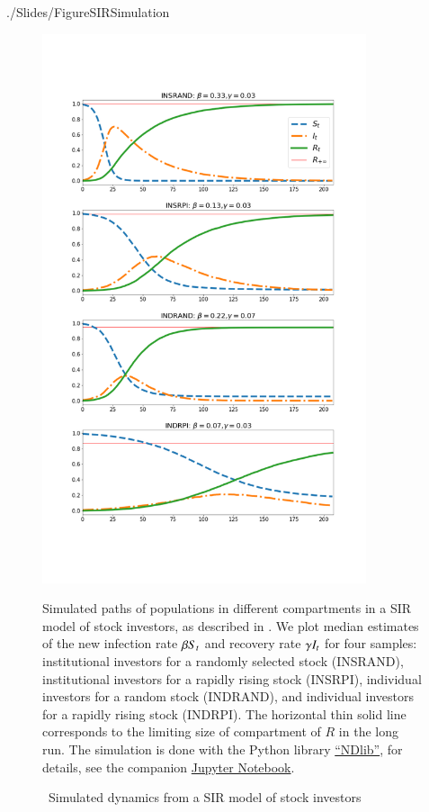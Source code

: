 \begin{verbatimwrite}{./Slides/FigureSIRSimulation}%
    \begin{figure} \centering  %
        \caption{ ~Simulated dynamics from a SIR model of stock investors}
        \label{fig:sir_simulate}
        \centerline{\includegraphics[width=0.85\textwidth,height=0.85\textheight]{./figures/sir_simulate}}
        \begin{flushleft}
            {\footnotesize Simulated paths of populations in different compartments in a SIR model of stock investors, as described in \cite{shiller1989survey}. We plot median estimates of the new infection rate $\beta \Susceptible_{t}$ and recovery rate $\gamma \Infected_{t}$ for four samples: institutional investors for a randomly selected stock (INSRAND), institutional investors for a rapidly rising stock (INSRPI), individual investors for a random stock (INDRAND), and individual investors for a rapidly rising stock (INDRPI). The horizontal thin solid line corresponds to the limiting size of compartment of $R$ in the long run. The simulation is done with the Python library \href{https://ndlib.readthedocs.io/en/latest/}{``NDlib''}, for details, see the companion \href{https://github.com/llorracc/EpiExp/blob/master/SIR_Ndlib.ipynb}{Jupyter Notebook}. }
        \end{flushleft}
    \end{figure}
\end{verbatimwrite}%


